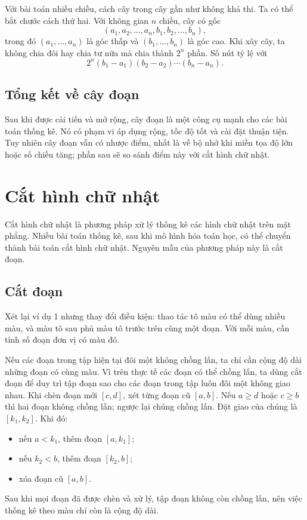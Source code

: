 \documentclass[11pt]{article}
\begin{document}
Với bài toán nhiều chiều, cách cây trong cây gần như không khả thi. Ta có thể
bắt chước cách thứ hai. Với không gian $n$ chiều, cây có gốc
\[
  (a_1,a_2,\ldots,a_n,b_1,b_2,\ldots,b_n),
\]
trong đó $(a_1,\ldots,a_n)$ là góc thấp và $(b_1,\ldots,b_n)$ là góc cao. Khi
xây cây, ta không chia đôi hay chia tư nữa mà chia thành $2^n$ phần. Số nút
tỷ lệ với
\[
  2^n(b_1-a_1)(b_2-a_2)\cdots(b_n-a_n).
\]

\subsection{Tổng kết về cây đoạn}

Sau khi được cải tiến và mở rộng, cây đoạn là một công cụ mạnh cho các bài
toán thống kê. Nó có phạm vi áp dụng rộng, tốc độ tốt và cài đặt thuận tiện.
Tuy nhiên cây đoạn vẫn có nhược điểm, nhất là về bộ nhớ khi miền tọa độ lớn
hoặc số chiều tăng; phần sau sẽ so sánh điểm này với cắt hình chữ nhật.

\section{Cắt hình chữ nhật}

Cắt hình chữ nhật là phương pháp xử lý thống kê các hình chữ nhật trên mặt
phẳng. Nhiều bài toán thống kê, sau khi mô hình hóa toán học, có thể chuyển
thành bài toán cắt hình chữ nhật. Nguyên mẫu của phương pháp này là cắt đoạn.

\subsection{Cắt đoạn}

Xét lại ví dụ 1 nhưng thay đổi điều kiện: thao tác tô màu có thể dùng nhiều
màu, và màu tô sau phủ màu tô trước trên cùng một đoạn. Với mỗi màu, cần tính
số đoạn đơn vị có màu đó.

Nếu các đoạn trong tập hiện tại đôi một không chồng lấn, ta chỉ cần cộng độ
dài những đoạn có cùng màu. Vì trên thực tế các đoạn có thể chồng lấn, ta
dùng cắt đoạn để duy trì tập đoạn sao cho các đoạn trong tập luôn đôi một
không giao nhau. Khi chèn đoạn mới $[c,d]$, xét từng đoạn cũ $[a,b]$. Nếu
$a\ge d$ hoặc $c\ge b$ thì hai đoạn không chồng lấn; ngược lại chúng chồng
lấn. Đặt giao của chúng là $[k_1,k_2]$. Khi đó:
\begin{itemize}
  \item nếu $a<k_1$, thêm đoạn $[a,k_1]$;
  \item nếu $k_2<b$, thêm đoạn $[k_2,b]$;
  \item xóa đoạn cũ $[a,b]$.
\end{itemize}
Sau khi mọi đoạn đã được chèn và xử lý, tập đoạn không còn chồng lấn, nên
việc thống kê theo màu chỉ còn là cộng độ dài.
\end{document}
